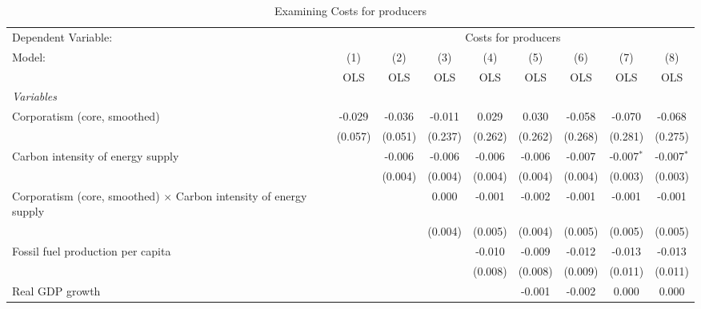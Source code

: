 
\begin{table}[htbp]
   \caption{Examining Costs for producers}
   \centering
   \begin{tabular}{lcccccccc}
      \toprule
      Dependent Variable: & \multicolumn{8}{c}{Costs for producers}\\
      Model:                                                                   & (1)     & (2)     & (3)     & (4)     & (5)     & (6)     & (7)          & (8)\\  
                                                                               &  OLS    & OLS     & OLS     & OLS     & OLS     & OLS     & OLS          & OLS\\  
      \midrule
      \emph{Variables}\\
      Corporatism (core, smoothed)                                             & -0.029  & -0.036  & -0.011  & 0.029   & 0.030   & -0.058  & -0.070       & -0.068\\   
                                                                               & (0.057) & (0.051) & (0.237) & (0.262) & (0.262) & (0.268) & (0.281)      & (0.275)\\   
      Carbon intensity of energy supply                                        &         & -0.006  & -0.006  & -0.006  & -0.006  & -0.007  & -0.007$^{*}$ & -0.007$^{*}$\\   
                                                                               &         & (0.004) & (0.004) & (0.004) & (0.004) & (0.004) & (0.003)      & (0.003)\\   
      Corporatism (core, smoothed) $\times$ Carbon intensity of energy supply  &         &         & 0.000   & -0.001  & -0.002  & -0.001  & -0.001       & -0.001\\   
                                                                               &         &         & (0.004) & (0.005) & (0.004) & (0.005) & (0.005)      & (0.005)\\   
      Fossil fuel production per capita                                        &         &         &         & -0.010  & -0.009  & -0.012  & -0.013       & -0.013\\   
                                                                               &         &         &         & (0.008) & (0.008) & (0.009) & (0.011)      & (0.011)\\   
      Real GDP growth                                                          &         &         &         &         & -0.001  & -0.002  & 0.000        & 0.000\\   

\end{tabular}
\end{table}

